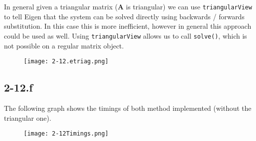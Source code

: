 \documentclass{article}
\begin{document}
\noindent In general given a triangular matrix ($\mathbf{A}$ is triangular) we can use \verb|triangularView| to tell Eigen that the system can be solved directly using backwards / forwards substitution. In this case this is more inefficient, however in general this approach could be used as well. Using \verb|triangularView| allows us to call \verb|solve()|, which is not possible on a regular matrix object.
\begin{figure}[!hbt]
    \centering
\texttt{[image: 2-12.etriag.png]}
\end{figure}

\subsection*{2-12.f}
The following graph shows the timings of both method implemented (without the triangular one).

\begin{figure}[!hbt]
    \centering
\texttt{[image: 2-12Timings.png]}
\end{figure}
\end{document}
